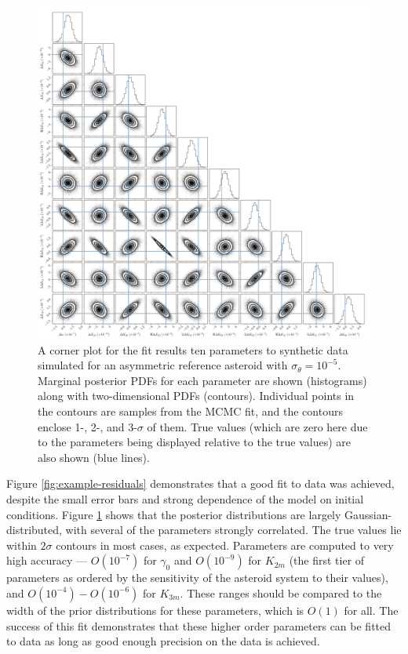 \documentclass{aastex631}
\begin{document}
\begin{figure}
  \centering
  \includegraphics[width=\textwidth]{example-corner.pdf}
  \caption{A corner plot for the fit results ten parameters to synthetic data simulated for an asymmetric reference asteroid with $\sigma_\theta = 10^{-5}$. Marginal posterior PDFs for each parameter are shown (histograms) along with two-dimensional PDFs (contours). Individual points in the contours are samples from the MCMC fit, and the contours enclose 1-, 2-, and 3-$\sigma$ of them. True values (which are zero here due to the parameters being displayed relative to the true values) are also shown (blue lines).}
  \label{fig:example-corner}
\end{figure}

Figure \ref{fig:example-residuals} demonstrates that a good fit to data was achieved, despite the small error bars and strong dependence of the model on initial conditions. Figure \ref{fig:example-corner} shows that the posterior distributions are largely Gaussian-distributed, with several of the parameters strongly correlated. The true values lie within $2\sigma$ contours in most cases, as expected. Parameters are computed to very high accuracy --- $O(10^{-7})$ for $\gamma_0$ and $O(10^{-9})$ for $K_{2m}$ (the first tier of parameters as ordered by the sensitivity of the asteroid system to their values), and $O(10^{-4})-O(10^{-6})$ for $K_{3m}$. These ranges should be compared to the width of the prior distributions for these parameters, which is $O(1)$ for all. The success of this fit demonstrates that these higher order parameters can be fitted to data as long as good enough precision on the data is achieved.



{}

\end{document}
